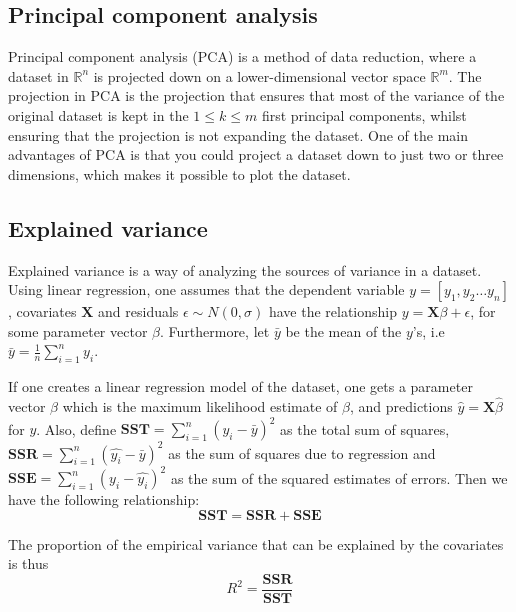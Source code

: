 \subsection{Principal component analysis}

Principal component analysis (PCA) is a method of data reduction, where a dataset in $\mathbb{R}^n$ is projected down on a lower-dimensional vector space $\mathbb{R}^m$. The projection in PCA is the projection that ensures that most of the variance of the original dataset is kept in the $1 \leq k \leq m$ first principal components, whilst ensuring that the projection is not expanding the dataset. One of the main advantages of PCA is that you could project a dataset down to just two or three dimensions, which makes it possible to plot the dataset.

\subsection{Explained variance}
\label{subsec:explained_variance}

Explained variance is a way of analyzing the sources of variance in a dataset. Using linear regression, one assumes that the dependent variable $y = [y_1, y_2 \dots y_n]$, covariates $\mathbf{X}$ and residuals $\epsilon \sim N(0, \sigma)$ have the relationship $y = \mathbf{X}\beta + \epsilon$, for some parameter vector $\beta$. Furthermore, let $\bar{y}$ be the mean of the $y$'s, i.e $\bar{y} = \frac{1}{n} \sum_{i=1}^n y_i$.


If one creates a linear regression model of the dataset, one gets a parameter vector $\hat{\beta}$ which is the maximum likelihood estimate of $\beta$, and predictions $\hat{y} = \mathbf{X} \hat{\beta}$ for $y$. Also, define $\mathbf{SST} = \sum_{i=1}^n \left(y_i - \bar{y}\right)^2$ as the total sum of squares, $\mathbf{SSR} = \sum_{i=1}^n \left(\hat{y_i} - \bar{y}\right)^2$ as the sum of squares due to regression and $\mathbf{SSE} = \sum_{i=1}^n \left(y_i - \hat{y_i}\right)^2$ as the sum of the squared estimates of errors. Then we have the following relationship:
$$\mathbf{SST} = \mathbf{SSR} + \mathbf{SSE}$$

The proportion of the empirical variance that can be explained by the covariates is thus
$$R^2 = \frac{\mathbf{SSR}}{\mathbf{SST}}$$



